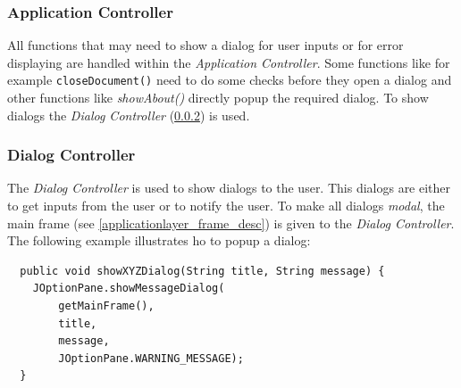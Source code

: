\subsubsection{Application Controller}
All functions that may need to show a dialog for user inputs or for error displaying are handled within the \textit{Application Controller}. Some functions like for example \texttt{closeDocument()} need to do some checks before they open a dialog and other functions like \textit{showAbout()} directly popup the required dialog. To show dialogs the \textit{Dialog Controller} (\ref{applicationlayer_dialogcontroller}) is used.

\subsubsection{Dialog Controller}
\label{applicationlayer_dialogcontroller}
The \textit{Dialog Controller} is used to show dialogs to the user. This dialogs are either to get inputs from the user or to notify the user. To make all dialogs \textit{modal}, the main frame (see \ref{applicationlayer_frame_desc}) is given to the \textit{Dialog Controller}. The following example illustrates ho to popup a dialog:
\begin{verbatim}
  public void showXYZDialog(String title, String message) {
    JOptionPane.showMessageDialog(
        getMainFrame(),
        title,
        message,
        JOptionPane.WARNING_MESSAGE);
  }
\end{verbatim}



